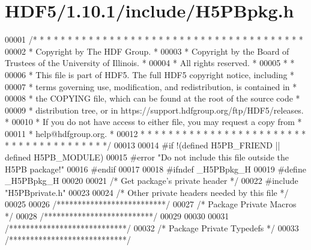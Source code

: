 \hypertarget{_h_d_f5_21_810_81_2include_2_h5_p_bpkg_8h_source}{}\section{H\+D\+F5/1.10.1/include/\+H5\+P\+Bpkg.h}
\label{_h_d_f5_21_810_81_2include_2_h5_p_bpkg_8h_source}

\begin{DoxyCode}
00001 \textcolor{comment}{/* * * * * * * * * * * * * * * * * * * * * * * * * * * * * * * * * * * * * * *}
00002 \textcolor{comment}{ * Copyright by The HDF Group.                                               *}
00003 \textcolor{comment}{ * Copyright by the Board of Trustees of the University of Illinois.         *}
00004 \textcolor{comment}{ * All rights reserved.                                                      *}
00005 \textcolor{comment}{ *                                                                           *}
00006 \textcolor{comment}{ * This file is part of HDF5.  The full HDF5 copyright notice, including     *}
00007 \textcolor{comment}{ * terms governing use, modification, and redistribution, is contained in    *}
00008 \textcolor{comment}{ * the COPYING file, which can be found at the root of the source code       *}
00009 \textcolor{comment}{ * distribution tree, or in https://support.hdfgroup.org/ftp/HDF5/releases.  *}
00010 \textcolor{comment}{ * If you do not have access to either file, you may request a copy from     *}
00011 \textcolor{comment}{ * help@hdfgroup.org.                                                        *}
00012 \textcolor{comment}{ * * * * * * * * * * * * * * * * * * * * * * * * * * * * * * * * * * * * * * */}
00013 
00014 \textcolor{preprocessor}{#if !(defined H5PB\_FRIEND || defined H5PB\_MODULE)}
00015 \textcolor{preprocessor}{#error "Do not include this file outside the H5PB package!"}
00016 \textcolor{preprocessor}{#endif}
00017 
00018 \textcolor{preprocessor}{#ifndef \_H5PBpkg\_H}
00019 \textcolor{preprocessor}{#define \_H5PBpkg\_H}
00020 
00021 \textcolor{comment}{/* Get package's private header */}
00022 \textcolor{preprocessor}{#include "H5PBprivate.h"}
00023 
00024 \textcolor{comment}{/* Other private headers needed by this file */}
00025 
00026 \textcolor{comment}{/**************************/}
00027 \textcolor{comment}{/* Package Private Macros */}
00028 \textcolor{comment}{/**************************/}
00029 
00030 
00031 \textcolor{comment}{/****************************/}
00032 \textcolor{comment}{/* Package Private Typedefs */}
00033 \textcolor{comment}{/****************************/}

\end{DoxyCode}
